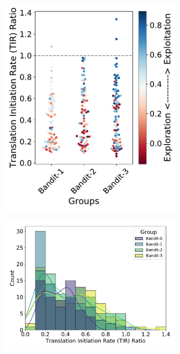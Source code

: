 \documentclass{scrartcl}[2013/05/29]%
\begin{document}
\begin{figure}[!ht]
\begin{subfigure}[b]{0.25\textwidth}
    \end{subfigure}
    \begin{subfigure}[b]{0.25\textwidth}
        \centering
        \caption{}
        \includegraphics[scale=0.35]{plots/Main_Paper/swarmplot_proj.pdf}
    \end{subfigure}
    \begin{subfigure}[b]{0.48\textwidth}
        \centering
        \caption{}
        \includegraphics[scale=0.4]{plots/Main_Paper/histogram.pdf}

\end{subfigure}
\end{figure}
\end{document}
